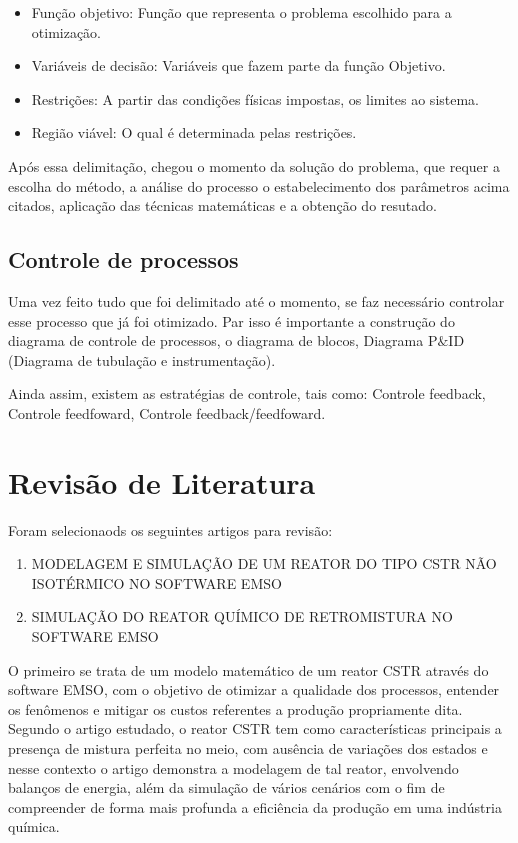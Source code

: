 \documentclass[
	12pt,				%
	openright,			%
	oneside,			%
	a4paper,			%
	english,			%
	french,				%
	spanish,			%
	brazil				%
	]{abntex2}
\begin{document}
\begin{itemize}
\item Função objetivo: Função que representa o problema escolhido para a otimização.
\item Variáveis de decisão: Variáveis que fazem parte da função Objetivo.
\item Restrições: A partir das condições físicas impostas, os limites ao sistema.
\item Região viável: O qual é determinada pelas restrições.
\end{itemize}

Após essa delimitação, chegou o momento da solução do problema, que requer a escolha do método, a análise do processo o estabelecimento dos parâmetros acima citados, aplicação das técnicas matemáticas e a obtenção do resutado.

\subsection{Controle de processos}

Uma vez feito tudo que foi delimitado até o momento, se faz necessário controlar esse processo que já foi otimizado. Par isso é importante a construção do diagrama de controle de processos, o diagrama de blocos, Diagrama P$\&$ID (Diagrama de tubulação e instrumentação).

Ainda assim, existem as estratégias de controle, tais como: Controle feedback, Controle feedfoward,  Controle feedback/feedfoward.

\section{Revisão de Literatura}

Foram selecionaods os seguintes artigos para revisão: 

\begin{enumerate}
\item MODELAGEM E SIMULAÇÃO DE UM REATOR DO TIPO CSTR NÃO ISOTÉRMICO NO SOFTWARE EMSO \cite{souza2020modelagem}
\item SIMULAÇÃO DO REATOR QUÍMICO DE RETROMISTURA NO SOFTWARE EMSO \cite{schultz2013simulaccao}
\end{enumerate}

O primeiro se trata de um modelo matemático de um reator CSTR através do software EMSO, com o objetivo de otimizar a qualidade dos processos, entender os fenômenos e mitigar os custos referentes a produção propriamente dita. Segundo o artigo estudado, o reator CSTR tem como características principais a presença de mistura perfeita no meio, com ausência de variações dos estados e nesse contexto o artigo demonstra a modelagem de tal reator, envolvendo balanços de energia, além da simulação de vários cenários com o fim de compreender de forma mais profunda a eficiência da produção em uma indústria química.
\end{document}
